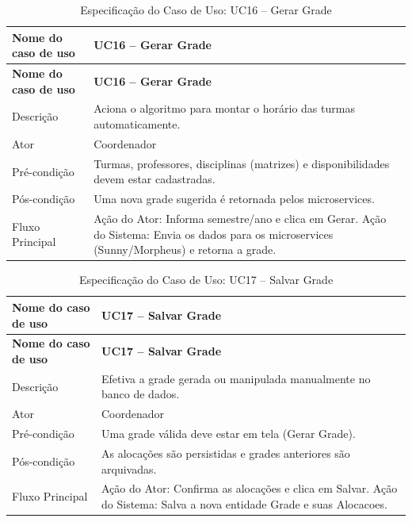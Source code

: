 \fonteautores

\vspace{\baselineskip}

\Needspace{0.48\textheight}
\begin{longtable}{|L{4.5cm}|L{10.5cm}|}
\caption{Especificação do Caso de Uso: UC16 -- Gerar Grade} \\
\hline
\textbf{Nome do caso de uso} & \textbf{UC16 -- Gerar Grade} \\
\hline
\endfirsthead
\hline
\textbf{Nome do caso de uso} & \textbf{UC16 -- Gerar Grade} \\
\hline
\endhead
Descrição       & Aciona o algoritmo para montar o horário das turmas automaticamente. \\
\hline
Ator            & Coordenador \\
\hline
Pré-condição    & Turmas, professores, disciplinas (matrizes) e disponibilidades devem estar cadastradas. \\
\hline
Pós-condição    & Uma nova grade sugerida é retornada pelos microservices. \\
\hline
Fluxo Principal & Ação do Ator: Informa semestre/ano e clica em Gerar. Ação do Sistema: Envia os dados para os microservices (Sunny/Morpheus) e retorna a grade. \\
\hline
\end{longtable}

\fonteautores

\vspace{\baselineskip}

\Needspace{0.48\textheight}
\begin{longtable}{|L{4.5cm}|L{10.5cm}|}
\caption{Especificação do Caso de Uso: UC17 -- Salvar Grade} \\
\hline
\textbf{Nome do caso de uso} & \textbf{UC17 -- Salvar Grade} \\
\hline
\endfirsthead
\hline
\textbf{Nome do caso de uso} & \textbf{UC17 -- Salvar Grade} \\
\hline
\endhead
Descrição       & Efetiva a grade gerada ou manipulada manualmente no banco de dados. \\
\hline
Ator            & Coordenador \\
\hline
Pré-condição    & Uma grade válida deve estar em tela (Gerar Grade). \\
\hline
Pós-condição    & As alocações são persistidas e grades anteriores são arquivadas. \\
\hline
Fluxo Principal & Ação do Ator: Confirma as alocações e clica em Salvar. Ação do Sistema: Salva a nova entidade Grade e suas Alocacoes. \\
\hline
\end{longtable}


